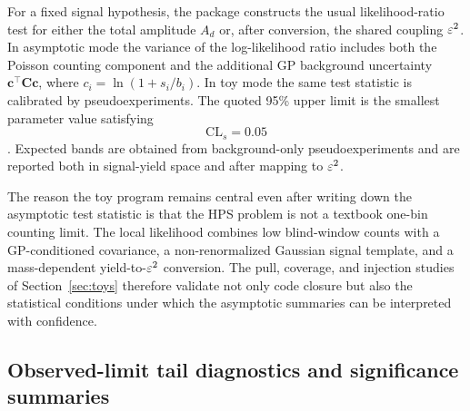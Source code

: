 For a fixed signal hypothesis, the package constructs the usual likelihood-ratio test
for either the total amplitude $A_d$ or, after conversion, the shared coupling
$\varepsilon^2$. In asymptotic mode the variance of the log-likelihood ratio includes both the
Poisson counting component and the additional GP background uncertainty
$\bm{c}^\top\bm{C}\bm{c}$, where $c_i=\ln(1+s_i/b_i)$. In toy mode the same test
statistic is calibrated by pseudoexperiments. The quoted 95\% upper limit is the
smallest parameter value satisfying
\begin{equation}
\mathrm{CL}_s = 0.05
\end{equation}
\cite{Junk1999,Read2002,Cowan2011}. Expected bands are obtained from background-only
pseudoexperiments and are reported both in signal-yield space and after mapping to
$\varepsilon^2$.

The reason the toy program remains central even after writing down the asymptotic test
statistic is that the HPS problem is not a textbook one-bin counting limit. The local
likelihood combines low blind-window counts with a GP-conditioned covariance, a
non-renormalized Gaussian signal template, and a mass-dependent yield-to-$\varepsilon^2$
conversion. The pull, coverage, and injection studies of Section~\ref{sec:toys}
therefore validate not only code closure but also the statistical conditions under
which the asymptotic summaries can be interpreted with confidence.

\subsection{Observed-limit tail diagnostics and significance summaries}

